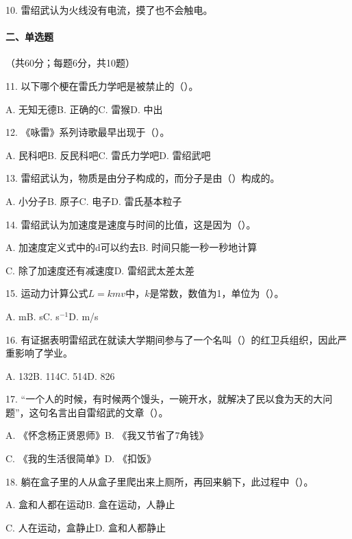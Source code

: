 \documentclass[UTF8,12pt,oneside]{ctexbook}
\begin{document}
        10. 雷绍武认为火线没有电流，摸了也不会触电。
        
    \newpage

     \paragraph{二、单选题}（共60分；每题6分，共10题）
        
        11. 以下哪个梗在雷氏力学吧是被禁止的（\qquad）。
        
        	A. 无知无德\qquad B. 正确的\qquad C. 雷猴\qquad D. 中出
        
        12. 《咏雷》系列诗歌最早出现于（\qquad）。
        
        	A. 民科吧\qquad B. 反民科吧\qquad C. 雷氏力学吧\qquad D. 雷绍武吧
        	
        13. 雷绍武认为，物质是由分子构成的，而分子是由（\qquad）构成的。
        
        A. 小分子\qquad B. 原子\qquad C. 电子\qquad D. 雷氏基本粒子
        
        14. 雷绍武认为加速度是速度与时间的比值，这是因为（\qquad）。
        
        	A. 加速度定义式中的d可以约去\qquad	B. 时间只能一秒一秒地计算
        	
        	C. 除了加速度还有减速度\qquad D. 雷绍武太差太差
        	
        15. 运动力计算公式$L=kmv$中，$k$是常数，数值为1，单位为（\qquad）。
        
        	A. m\qquad B. s\qquad C. s$^{-1}$\qquad D. m/s
        	
        16. 有证据表明雷绍武在就读大学期间参与了一个名叫（\qquad ）的红卫兵组织，因此严重影响了学业。
        
        	A. 132\qquad B. 114\qquad C. 514\qquad D. 826
        	
        17. “一个人的时候，有时候两个馒头，一碗开水，就解决了民以食为天的大问题”，这句名言出自雷绍武的文章（\qquad）。
        
        	A. 《怀念杨正贤恩师》\qquad B. 《我又节省了7角钱》
        	
        	C. 《我的生活很简单》\qquad D. 《扣饭》
        	
        18. 躺在盒子里的人从盒子里爬出来上厕所，再回来躺下，此过程中（\qquad）。
        
        	A. 盒和人都在运动\qquad B. 盒在运动，人静止
        	
        	C. 人在运动，盒静止\qquad D. 盒和人都静止
        	
\end{document}
